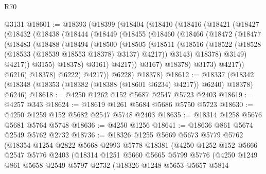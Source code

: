 \begin{lexlean}{R70}
\begin{coremodule}
    @3131
@18601 := @18393
    (@18399
      (@18404
        (@18410
          (@18416
            (@18421
              (@18427
                (@18432
                  (@18438
                    (@18444
                      (@18449
                        (@18455
                          (@18460
                            (@18466
                              (@18472
                                (@18477
                                  (@18483
                                    (@18488
                                      (@18494
                                        (@18500
                                          (@18505
                                            (@18511
                                              (@18516
                                                (@18522
                                                  (@18528
                                                    (@18533 (@18539 @18553 @18378) @3137)
                                                    @4217))
                                                @3143)
                                              @18378)
                                            @3149)
                                          @4217))
                                      @3155)
                                    @18378)
                                  @3161)
                                @4217))
                            @3167)
                          @18378)
                        @3173)
                      @4217))
                  @6216)
                @18378)
              @6222)
            @4217))
        @6228)
      @18378)
@18612 := @18337
    (@18342 (@18348 (@18353 (@18382 (@18388 (@18601 @6234) @4217)) @6240) @18378) @6246)
@18618 := @4250 @1262 @152 @5687 @2547 @5723 @2403
@18619 := @4257 @343
@18624 := @18619 @1261 @5684 @5686 @5750 @5723
@18630 := @4250 @1259 @152 @5682 @2547 @5748 @2403
@18635 := @18314 @1258 @5676 @5681 @5764 @5748
@18636 := @4250 @1256
@18641 := @18636 @861 @5674 @2549 @5762 @2732
@18736 := @18326
    @1255
    @5669
    @5673
    @5779
    @5762
    (@18354
      @1254
      @2822
      @5668
      @2993
      @5778
      @18381
      (@4250
        @1252
        @152
        @5666
        @2547
        @5776
        @2403
        (@18314
          @1251
          @5660
          @5665
          @5799
          @5776
          (@4250
            @1249
            @861
            @5658
            @2549
            @5797
            @2732
            (@18326
              @1248
              @5653
              @5657
              @5814

\end{coremodule}
\end{lexlean}
